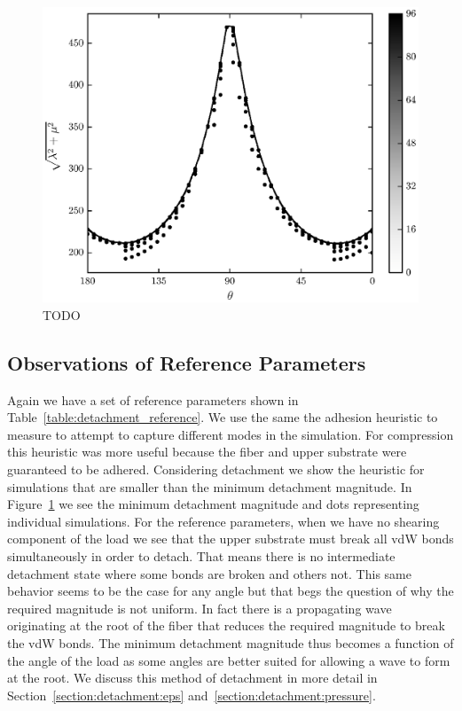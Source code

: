 	\begin{figure}
		\begin{center}
			\includegraphics{./fig/ch3/pull/ref/grid.eps}
		\end{center}		
		\caption{ TODO
		\label{fig:PullGrid}}
	\end{figure}

\subsection{Observations of Reference Parameters}

Again we have a set of reference parameters shown in Table~\ref{table:detachment_reference}. We use the same the adhesion heuristic to measure to attempt to capture different modes in the simulation. For compression this heuristic was more useful because the fiber and upper substrate were guaranteed to be adhered. Considering detachment we show the heuristic for simulations that are smaller than the minimum detachment magnitude. In Figure~\ref{fig:PullGrid} we see the minimum detachment magnitude and dots representing individual simulations. For the reference parameters, when we have no shearing component of the load we see that the upper substrate must break all vdW bonds simultaneously in order to detach. That means there is no intermediate detachment state where some bonds are broken and others not. This same behavior seems to be the case for any angle but that begs the question of why the required magnitude is not uniform. In fact there is a propagating wave originating at the root of the fiber that reduces the required magnitude to break the vdW bonds. The minimum detachment magnitude thus becomes a function of the angle of the load as some angles are better suited for allowing a wave to form at the root. We discuss this method of detachment in more detail in Section~\ref{section:detachment:eps} and~\ref{section:detachment:pressure}.

